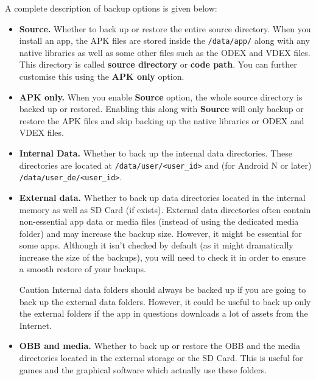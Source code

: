 A complete description of backup options is given below:
\begin{itemize}
    \item \textbf{Source.} Whether to back up or restore the entire source directory. When you install an app, the APK
    files are stored inside the \texttt{/data/app/} along with any native libraries as well as some other files such as
    the ODEX and VDEX files. This directory is called \textbf{source directory} or \textbf{code path}. You can further
    customise this using the \textbf{APK only} option.

    \item \textbf{APK only.} When you enable \textbf{Source} option, the whole source directory is backed up or
    restored. Enabling this along with \textbf{Source} will only backup or restore the APK files and skip backing up the
    native libraries or ODEX and VDEX files.

    \item \textbf{Internal Data.} Whether to back up the internal data directories. These directories are located at
    \texttt{/data/user/<user\_id>} and (for Android N or later) \texttt{/data/user\_de/<user\_id>}.

    \item \textbf{External data.} Whether to back up data directories located in the internal memory as well as SD Card
    (if exists). External data directories often contain non-essential app data or media files (instead of using the
    dedicated media folder) and may increase the backup size. However, it might be essential for some apps. Although
    it isn't checked by default (as it might dramatically increase the size of the backups), you will need to check it
    in order to ensure a smooth restore of your backups.
    \begin{warning}{Caution}
        Internal data folders should always be backed up if you are going to back up the external data folders. However,
        it could be useful to back up only the external folders if the app in questions downloads a lot of assets from
        the Internet.
    \end{warning}

    \item \textbf{OBB and media.} Whether to back up or restore the OBB and the media directories located in the
    external storage or the SD Card. This is useful for games and the graphical software which actually use these
    folders.


\end{itemize}
